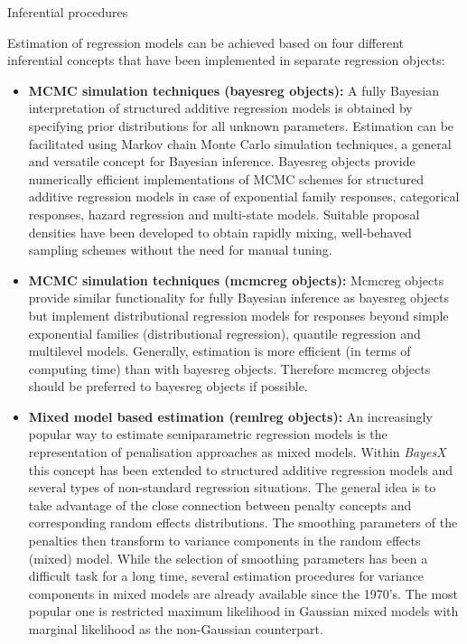 \begin{stanza}{Inferential procedures}

Estimation of regression models can be achieved based on four
different inferential concepts that have been implemented in
separate regression objects:

\begin{itemize}
\item {\bf\sffamily MCMC simulation techniques (bayesreg objects):} A fully Bayesian interpretation of structured additive
    regression models is obtained by specifying prior distributions for all unknown parameters. Estimation can be
    facilitated using Markov chain Monte Carlo simulation techniques, a general and versatile concept for Bayesian
    inference. Bayesreg objects provide numerically efficient implementations of MCMC schemes for structured additive
    regression models in case of exponential family responses, categorical responses, hazard regression and multi-state models.
    Suitable proposal densities have been developed to obtain rapidly mixing, well-behaved sampling
    schemes without the need for manual tuning.
\item {\bf\sffamily MCMC simulation techniques (mcmcreg objects):} Mcmcreg objects provide similar functionality for fully Bayesian inference as bayesreg objects but implement distributional regression models for responses beyond simple exponential families (distributional regression), quantile regression and multilevel models. Generally, estimation is more efficient (in terms of computing time) than with bayesreg objects. Therefore mcmcreg objects should be preferred to bayesreg objects if possible.
\item{\bf\sffamily Mixed model based estimation (remlreg objects):} An increasingly popular way to estimate semiparametric
    regression models is the representation of penalisation approaches as mixed models. Within {\em BayesX }this concept
    has been extended to structured additive regression  models and several types of non-standard regression situations.
    The general idea is to take advantage of the close  connection between penalty concepts and corresponding random
    effects distributions. The smoothing parameters of the  penalties then transform to variance components in the random
    effects (mixed) model. While the selection of smoothing  parameters has been a difficult task for a long time, several
    estimation procedures for variance components in mixed models are already available since the 1970's. The most popular
    one is restricted maximum likelihood in Gaussian mixed models with marginal likelihood as the non-Gaussian counterpart.

\end{itemize}
\end{stanza}

